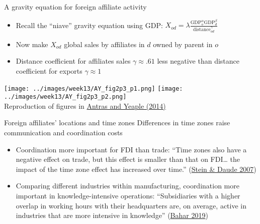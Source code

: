 \documentclass[11pt,notes=hide,aspectratio=169]{beamer}
\begin{document}
\begin{frame}{A gravity equation for foreign affiliate activity}
\begin{itemize}
	\item Recall the ``niave'' gravity equation using GDP: $X_{od} = \lambda \frac{\text{GDP}_o^{\alpha} \text{GDP}_d^{\beta}}{\text{distance}_{od}^{\gamma}}$
	\item Now make $X_{od}$ global sales by affiliates in $d$ owned by parent in $o$
	\item Distance coefficient for affiliates sales  $\gamma \approx .61$ less negative than distance coefficient for exports $\gamma \approx 1$
\end{itemize}
\begin{center}
\texttt{[image: ../images/week13/AY\_fig2p3\_p1.png]}
\texttt{[image: ../images/week13/AY\_fig2p3\_p2.png]} \\
\vspace{-2mm}
{\footnotesize Reproduction of figures in \href{http://scholar.harvard.edu/antras/publications/multinational-firms-and-structure-international-trade}{Antras and Yeaple (2014)}}
\end{center}
\end{frame}
\begin{frame}{Foreign affiliates' locations and time zones}
Differences in time zones raise communication and coordination costs
\begin{itemize}
\item
Coordination more important for FDI than trade:
``Time zones also have a negative effect on trade, but this effect is smaller than that on FDI\dots
the impact of the time zone effect has increased over time.''
{\small(\href{https://www-sciencedirect-com.proxy.uchicago.edu/science/article/pii/S002219960600064X}{Stein \& Daude 2007})}
\item 
Comparing different industries within manufacturing,
coordination more important in knowledge-intensive operations:
``Subsidiaries with a higher overlap in working hours with their headquarters are, on average, active in industries that are more intensive in knowledge''
{\small(\href{https://voxeu.org/article/time-zones-and-knowledge-distance-trade}{Bahar 2019})}
\end{itemize}
\end{frame}
\end{document}
